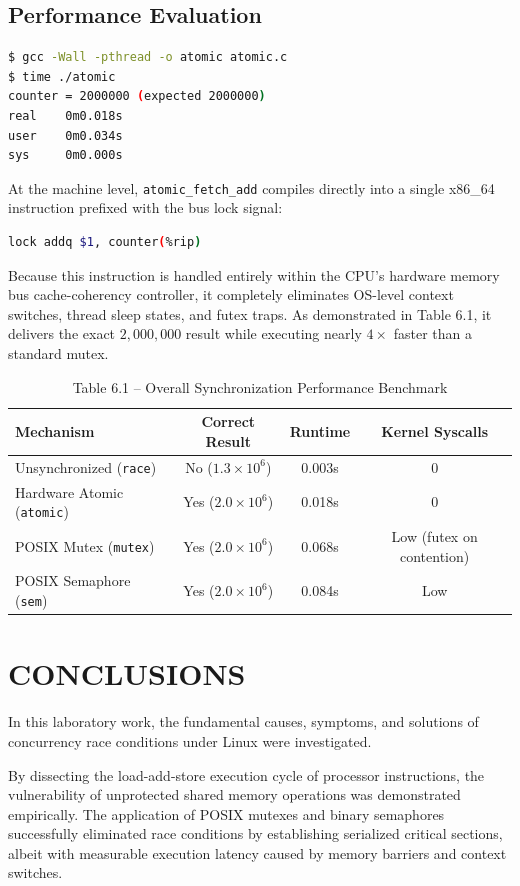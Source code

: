 \documentclass[12pt,a4paper]{report}
\numberwithin{equation}{chapter}
\numberwithin{figure}{chapter}
\numberwithin{table}{chapter}
\begin{document}
\section{Performance Evaluation}
\begin{lstlisting}[language=bash]
$ gcc -Wall -pthread -o atomic atomic.c
$ time ./atomic
counter = 2000000 (expected 2000000)
real    0m0.018s
user    0m0.034s
sys     0m0.000s
\end{lstlisting}

At the machine level, \texttt{atomic\_fetch\_add} compiles directly into a single x86\_64 instruction prefixed with the bus lock signal:
\begin{lstlisting}[language=bash]
lock addq $1, counter(%rip)
\end{lstlisting}
Because this instruction is handled entirely within the CPU's hardware memory bus cache-coherency controller, it completely eliminates OS-level context switches, thread sleep states, and futex traps. As demonstrated in Table 6.1, it delivers the exact $2{,}000{,}000$ result while executing nearly $4\times$ faster than a standard mutex.

\begin{table}[H]
\centering
\caption{Table 6.1 -- Overall Synchronization Performance Benchmark}
\begin{tabular}{lccc}
\toprule
\textbf{Mechanism} & \textbf{Correct Result} & \textbf{Runtime} & \textbf{Kernel Syscalls} \\
\midrule
Unsynchronized (\texttt{race}) & No ($1.3 \times 10^6$) & 0.003s & 0 \\
Hardware Atomic (\texttt{atomic}) & Yes ($2.0 \times 10^6$) & 0.018s & 0 \\
POSIX Mutex (\texttt{mutex}) & Yes ($2.0 \times 10^6$) & 0.068s & Low (futex on contention) \\
POSIX Semaphore (\texttt{sem}) & Yes ($2.0 \times 10^6$) & 0.084s & Low \\
\bottomrule
\end{tabular}
\end{table}

\chapter{CONCLUSIONS}
In this laboratory work, the fundamental causes, symptoms, and solutions of concurrency race conditions under Linux were investigated.

By dissecting the load-add-store execution cycle of processor instructions, the vulnerability of unprotected shared memory operations was demonstrated empirically. The application of POSIX mutexes and binary semaphores successfully eliminated race conditions by establishing serialized critical sections, albeit with measurable execution latency caused by memory barriers and context switches.
\end{document}
